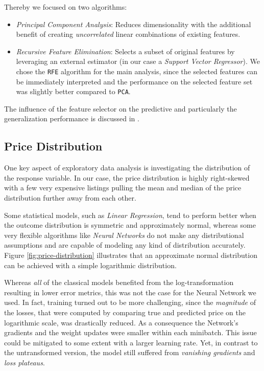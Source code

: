 Thereby we focused on two algorithms:
\begin{itemize}
  \item \emph{Principal Component Analysis}:
        Reduces dimensionality with the additional benefit of creating \emph{uncorrelated} linear combinations of existing features.
  \item \emph{Recursive Feature Elimination}:
        Selects a subset of original features by leveraging an external estimator (in our case a \emph{Support Vector Regressor}).
        We chose the \texttt{RFE} algorithm for the main analysis, since the selected features can be immediately interpreted and the performance on the selected feature set was slightly better compared to \texttt{PCA}.

\end{itemize}

The influence of the feature selector on the predictive and particularly the generalization performance is discussed in .

\subsection{Price Distribution} \label{appendix:price-distribution}

One key aspect of exploratory data analysis is investigating the distribution of the response variable.
In our case, the price distribution is highly right-skewed with a few very expensive listings pulling the mean and median of the price distribution further away from each other.

Some statistical models, such as \emph{Linear Regression}, tend to perform better when the outcome distribution is symmetric and approximately normal, whereas some very flexible algorithms like \emph{Neural Networks} do not make any distributional assumptions and are capable of modeling any kind of distribution accurately.
Figure \ref{fig:price-distribution} illustrates that an approximate normal distribution can be achieved with a simple logarithmic distribution.

Whereas \emph{all} of the classical models benefited from the log-transformation resulting in lower error metrics, this was not the case for the Neural Network we used.
In fact, training turned out to be more challenging, since the \emph{magnitude} of the losses, that were computed by comparing true and predicted price on the logarithmic scale, was drastically reduced.
As a consequence the Network's gradients and the weight updates were smaller within each minibatch.
This issue could be mitigated to some extent with a larger learning rate.
Yet, in contrast to the untransformed version, the model still suffered from \emph{vanishing gradients} and \emph{loss plateaus}.

